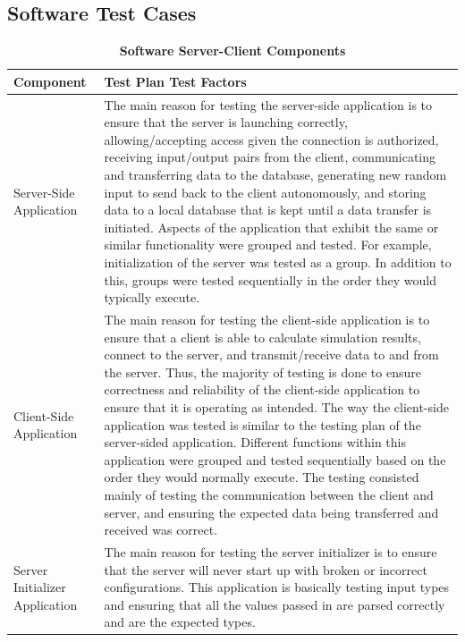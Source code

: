 \documentclass[12pt, titlepage]{article}
\begin{document}
\subsection{Software Test Cases}
\begin{center}
\begin{table}[H]
\centering
\begin{tabular}{ |p{5cm}|p{10cm}|  } 
 \hline
\bf Component & \bf Test Plan Test Factors\\
\hline
 Server-Side Application & The main reason for testing the server-side application is to ensure that the server is launching correctly, allowing/accepting access given the connection is authorized, receiving input/output pairs from the client, communicating and transferring data to the database, generating new random input to send back to the client autonomously, and storing data to a local database that is kept until a data transfer is initiated. Aspects of the application that exhibit the same or similar functionality were grouped and tested. For example, initialization of the server was tested as a group. In addition to this, groups were tested sequentially in the order they would typically execute.\\
\hline
Client-Side Application & The main reason for testing the client-side application is to ensure that a client is able to calculate simulation results, connect to the server, and transmit/receive data to and from the server. Thus, the majority of testing is done to ensure correctness and reliability of the client-side application to ensure that it is operating as intended. The way the client-side application was tested is similar to the testing plan of the server-sided application. Different functions within this application were grouped and tested sequentially based on the order they would normally execute. The testing consisted mainly of testing the communication between the client and server, and ensuring the expected data being transferred and received was correct.\\
\hline
Server Initializer Application & The main reason for testing the server initializer is to ensure that the server will never start up with broken or incorrect configurations. This application is basically testing input types and ensuring that all the values passed in are parsed correctly and are the expected types.\\
\hline
\end{tabular}
\caption{\bf Software Server-Client Components}
\label{tab:my_label}
\end{table}
\end{center}
\end{document}
